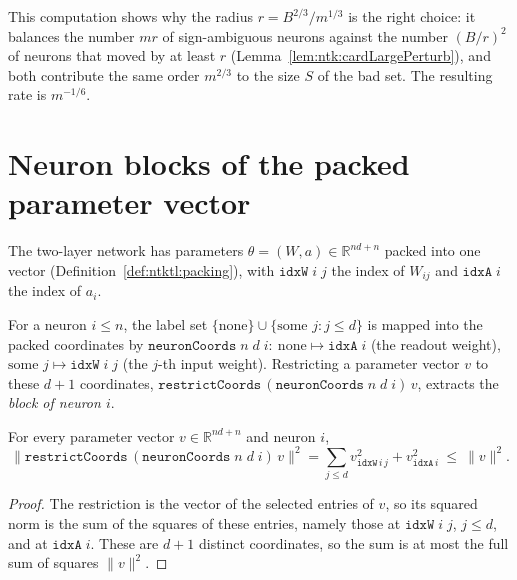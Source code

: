 This computation shows why the radius $r=B^{2/3}/m^{1/3}$ is the right choice: it balances the number $mr$ of sign-ambiguous neurons against the number $(B/r)^2$ of neurons that moved by at least $r$ (Lemma~\ref{lem:ntk:cardLargePerturb}), and both contribute the same order $m^{2/3}$ to the size $S$ of the bad set. The resulting rate is $m^{-1/6}$.


\section{Neuron blocks of the packed parameter vector}\label{sec:ntkhelp:neuron}

The two-layer network has parameters $\theta=(W,a)\in\mathbb R^{nd+n}$ packed into one vector (Definition~\ref{def:ntktl:packing}), with $\texttt{idxW}\;i\;j$ the index of $W_{ij}$ and $\texttt{idxA}\;i$ the index of $a_i$.

\begin{definition}\label{def:ntkhelp:neuronCoords}
  \leanok
For a neuron $i\le n$, the label set $\{\text{none}\}\cup\{\text{some }j:j\le d\}$ is mapped into the packed coordinates by $\texttt{neuronCoords}\;n\;d\;i:\ \text{none}\mapsto\texttt{idxA}\;i$ (the readout weight), $\text{some }j\mapsto\texttt{idxW}\;i\;j$ (the $j$-th input weight). Restricting a parameter vector $v$ to these $d+1$ coordinates, $\texttt{restrictCoords}\,(\texttt{neuronCoords}\;n\;d\;i)\,v$, extracts the \emph{block of neuron $i$}.
\end{definition}

\begin{lemma}\label{lem:ntkhelp:neuronBlockNorm}
  \leanok
For every parameter vector $v\in\mathbb R^{nd+n}$ and neuron $i$,
\[
  \bigl\|\texttt{restrictCoords}\,(\texttt{neuronCoords}\;n\;d\;i)\,v\bigr\|^2=\sum_{j\le d}v_{\texttt{idxW}\,i\,j}^2+v_{\texttt{idxA}\,i}^2\ \le\ \|v\|^2 .
\]
\end{lemma}

\begin{proof}
  \leanok
The restriction is the vector of the selected entries of $v$, so its squared norm is the sum of the squares of these entries, namely those at $\texttt{idxW}\;i\;j$, $j\le d$, and at $\texttt{idxA}\;i$. These are $d+1$ distinct coordinates, so the sum is at most the full sum of squares $\|v\|^2$.
\end{proof}

